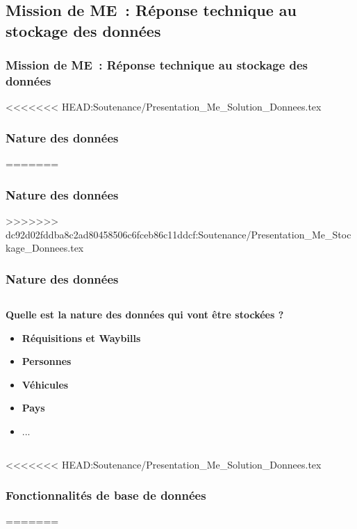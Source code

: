 \subsection{Mission de ME~: Réponse technique au stockage des données}
\begin{frame}
	\frametitle{Mission de ME~: Réponse technique au stockage des données}
\end{frame}



<<<<<<< HEAD:Soutenance/Presentation_Me_Solution_Donnees.tex
\subsubsection[Nature des données]{Nature des données}
=======
\subsubsection{Nature des données}
>>>>>>> dc92d02fddba8c2ad80458506c6fceb86c11ddcf:Soutenance/Presentation_Me_Stockage_Donnees.tex
\begin{frame}
\frametitle{Nature des données}
\begin{columns}[c]
\begin{column}{12cm}
\begin{block}{\textbf{Quelle est la nature des données qui vont être stockées ?}}
\begin{itemize}
\item<2-> \textbf{Réquisitions et Waybills}
\item<3-> \textbf{Personnes}
\item<4-> \textbf{Véhicules}
\item<5-> \textbf{Pays}
\item<6-> ...
\end{itemize}
\end{block}
\end{column}
\end{columns}
\end{frame}

<<<<<<< HEAD:Soutenance/Presentation_Me_Solution_Donnees.tex
\subsubsection[Fonctionnalités de base de données]{Fonctionnalités de base de données}
=======

